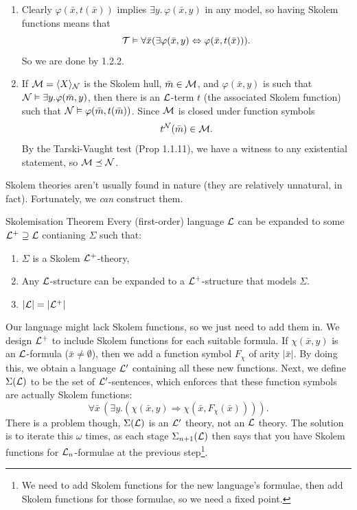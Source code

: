 \documentclass{article}
\numberwithin{thm}{subsection}
\begin{document}
\proof \hspace{0.1cm}
\begin{enumerate}
    \item Clearly $\varphi(\bar x, t(\bar x))$ implies $\exists y.\, \varphi(\bar x, y)$ in any model, so having Skolem functions means that \[ \mathcal{T} \vDash \forall \bar x (\exists \varphi(\bar x, y) \Leftrightarrow \varphi(\bar x, t(\bar x))).\] So we are done by 1.2.2.
    \item If $\mathcal{M} = \langle X \rangle_{\mathcal{N}}$ is the Skolem hull, $\bar m \in \mathcal{M}$, and $\varphi(\bar x, y)$ is such that $\mathcal{N} \vDash \exists y. \varphi(\bar m, y)$, then there is an $\mathcal{L}$-term $t$ (the associated Skolem function) such that $\mathcal{N} \vDash \varphi(\bar m, t(\bar m))$. \gap Since $\mathcal{M}$ is closed under function symbols \[ t^{\mathcal{N}}(\bar m) \in \mathcal{M}.\] By the Tarski-Vaught test (Prop 1.1.11), we have a witness to any existential statement, so $\mathcal{M} \preceq \mathcal{N}$. \endproof
\end{enumerate}
Skolem theories aren't usually found in nature (they are relatively unnatural, in fact). Fortunately, we \textit{can} construct them.
\begin{fancythm}{Skolemisation Theorem}
    Every (first-order) language $\mathcal{L}$ can be expanded to some $\mathcal{L}^{+} \supseteq \mathcal{L}$ contianing $\Sigma$ such that:
    \begin{enumerate}
        \item $\Sigma$ is a Skolem $\mathcal{L}^{+}$-theory,
        \item Any $\mathcal{L}$-structure can be expanded to a $\mathcal{L}^{+}$-structure that models $\Sigma$.
        \item $|\mathcal{L}| = |\mathcal{L}^{+}|$
    \end{enumerate}
\end{fancythm}
\idea Our language might lack Skolem functions, so we just need to add them in. We design $\mathcal{L}^{+}$ to include Skolem functions for each suitable formula.
\proof If $\chi(\bar x, y)$ is an $\mathcal{L}$-formula ($\bar x \neq \emptyset$), then we add a function symbol $F_{\chi}$ of arity $|\bar x|$. By doing this, we obtain a language $\mathcal{L}'$ containing all these new functions. \gap Next, we define $\Sigma(\mathcal{L})$ to be the set of $\mathcal{L}'$-sentences, which enforces that these function symbols are actually Skolem functions: \[ \forall \bar x \, (\exists y. (\chi(\bar x,y) \Rightarrow \chi(\bar x, F_{\chi}(\bar x)))). \tag{$*$} \]
There is a problem though, $\Sigma(\mathcal{L})$ is an $\mathcal{L}'$ theory, not an $\mathcal{L}$ theory. The solution is to iterate this $\omega$ times, as each stage $\Sigma_{n+1}(\mathcal{L})$ then says that you have Skolem functions for $\mathcal{L}_{n}$-formulae at the previous step\footnote{We need to add Skolem functions for the new language's formulae, then add Skolem functions for those formulae, so we need a fixed point.}. \gap 
\end{document}
